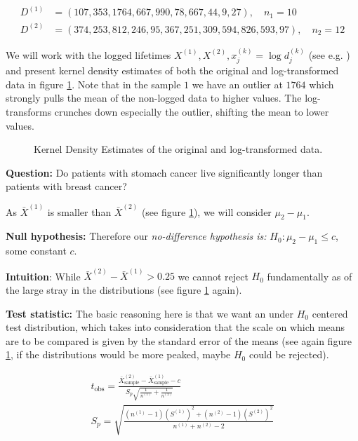 \begin{equation}
    \begin{aligned}
        D^{(1)} &= (107, 353, 1764, 667, 990, 78, 667, 44, 9, 27), \quad n_1 = 10 \\
        D^{(2)} &= (374, 253, 812, 246, 95, 367, 251, 309, 594, 826, 593, 97), \quad n_2 = 12
    \end{aligned}
\end{equation}

We will work with the logged lifetimes $X^{(1)}, X^{(2)}, x^{(k)}_j=\log{d^{(k)}_j}$ (see e.g. \cite{over04}) and present kernel density estimates of
both the original and log-transformed data in figure \ref{fig:surv_kde}. Note that in the sample $1$ we have an outlier at $1764$ which strongly
pulls the mean of the non-logged data to higher values. The log-transforms crunches down especially the outlier, shifting the mean to lower values.

\begin{figure}[!htb]
    \centering
    
    \caption{Kernel Density Estimates of the original and log-transformed data.}
    \label{fig:surv_kde}
\end{figure}

\textbf{Question:} Do patients with stomach cancer live significantly longer than patients with breast cancer?

As $\bar{X}^{(1)}$ is smaller than $\bar{X}^{(2)}$ (see figure \ref{fig:surv_kde}), we will consider $\mu_2 - \mu_1$.

\textbf{Null hypothesis:} Therefore our \textit{no-difference hypothesis is:} $H_0:\mu_2 - \mu_1 \leq c$, some constant $c$.

\textbf{Intuition}: While $\bar{X}^{(2)} - \bar{X}^{(1)} > 0.25$ we cannot reject $H_0$ fundamentally 
as of the large stray in the distributions (see figure \ref{fig:surv_kde} again).

\textbf{Test statistic:} The basic reasoning here is that we want an under $H_0$ centered test distribution,
which takes into consideration that the scale on which means are to be compared is given
by the standard error of the means (see again figure \ref{fig:surv_kde}, if the distributions
would be more peaked, maybe $H_0$ could be rejected).

\begin{equation}
    \begin{multlined}
    t_{\text{obs}} = \frac{\bar{X}^{(2)}_{\text{sample}} - \bar{X}^{(1)}_{\text{sample}} - c}{S_p\sqrt{\frac{1}{n^{(1)}} + \frac{1}{n^{(2)}}}} \\
    S_p = \sqrt{\frac{\left(n^{(1)} - 1\right)\left(S^{(1)}\right)^2 + \left(n^{(2)} - 1\right)\left(S^{(2)}\right)^2}{n^{(1)} + n^{(2)} - 2}} \\
    \end{multlined}
\end{equation}

